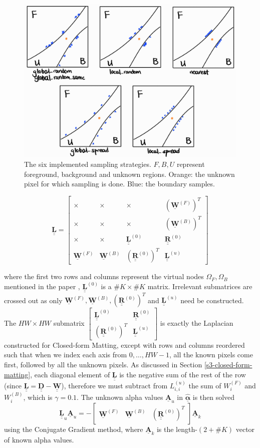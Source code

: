 \documentclass{article}
\newcommand{\bmat}[1]{\begin{bmatrix}#1\end{bmatrix}}
\theoremstyle{definition}
\def\vt#1{\underline{\mathbf{#1}}}
\def\vts#1{\underline{\boldsymbol{#1}}}
\def\mt#1{\underline{\underline{\mathbf{#1}}}}
\begin{document}
\begin{multicols}{2}[]
\begin{figure}[H]
    \centering
    \includegraphics[width=0.72\linewidth]{sampling}
    \caption{The six implemented sampling strategies. $F,B,U$ represent foreground, background and unknown regions. Orange: the unknown pixel for which sampling is done. Blue: the boundary samples.}
    \label{fig:sampling}
\end{figure}
$$\mt L = \left[\begin{smallmatrix}
    \times & \times & \times & \left(\vt W^{(F)}\right)^T \\
    \times & \times & \times & \left(\vt W^{(B)}\right)^T \\
    \times & \times & \mt L^{(0)} & \mt R^{(0)} \\
    \vt W^{(F)} & \vt W^{(B)} & \left(\mt  R^{(0)}\right)^T & \mt L^{(u)}
\end{smallmatrix}\right]$$

where the first two rows and columns represent the virtual nodes $\Omega_F,\Omega_B$ mentioned in the paper \cite[\S4.3]{robust-matting}, $\mt L^{(0)}$ is a $\#K \times \#K$ matrix. Irrelevant submatrices are crossed out as only $\vt W^{(F)}, \vt W^{(B)}, \left(\mt  R^{(0)}\right)^T$ and $\mt L^{(u)}$ need be constructed. The $HW\times HW$ submatrix $\left[\begin{smallmatrix}\mt L^{(0)} & \mt R^{(0)} \\ \left(\mt  R^{(0)}\right)^T & \mt L^{(u)}\end{smallmatrix}\right]$ is exactly the Laplacian constructed for Closed-form Matting, except with rows and columns reordered such that when we index each axis from $0,\dots,HW-1$, all the known pixels come first, followed by all the unknown pixels. As discussed in Section \ref{s3-closed-form-matting}, each diagonal element of $\mt L$ is the negative sum of the rest of the row (since $\mt L = \mt D - \mt W$), therefore we must subtract from $L^{(u)}_{i,i}$ the sum of $W^{(F)}_i$ and $W^{(B)}_i$, which is $\gamma=0.1$. The unknown alpha values $\vt A_u$ in $\hat{\vts \alpha}$ is then solved
$$\mt L_u \vt A_u = - \bmat{ \vt W^{(F)} & \vt W^{(B)} & \left(\mt  R^{(0)}\right)^T } \vt A_k$$
using the Conjugate Gradient method, where $\vt A_k$ is the length-$(2+\# K)$ vector of known alpha values.



\end{multicols}
\end{document}
